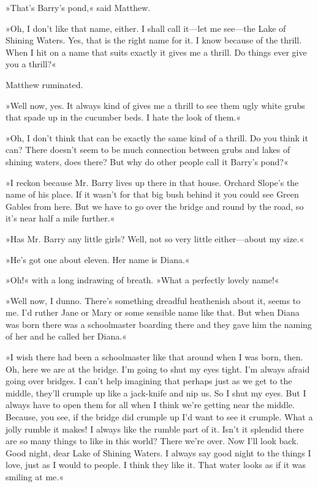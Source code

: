 »That’s Barry’s pond,« said Matthew.

»Oh, I don’t like that name, either. I shall call it—let me see—the Lake of Shining Waters. Yes, that is the right name for it. I know because of the thrill. When I hit on a name that suits exactly it gives me a thrill. Do things ever give you a thrill?«

Matthew ruminated.

»Well now, yes. It always kind of gives me a thrill to see them ugly white grubs that spade up in the cucumber beds. I hate the look of them.«

»Oh, I don’t think that can be exactly the same kind of a thrill. Do you think it can? There doesn’t seem to be much connection between grubs and lakes of shining waters, does there? But why do other people call it Barry’s pond?«

»I reckon because Mr. Barry lives up there in that house. Orchard Slope’s the name of his place. If it wasn’t for that big bush behind it you could see Green Gables from here. But we have to go over the bridge and round by the road, so it’s near half a mile further.«

»Has Mr. Barry any little girls? Well, not so very little either—about my size.«

»He’s got one about eleven. Her name is Diana.«

»Oh!« with a long indrawing of breath. »What a perfectly lovely name!«

»Well now, I dunno. There’s something dreadful heathenish about it, seems to me. I’d ruther Jane or Mary or some sensible name like that. But when Diana was born there was a schoolmaster boarding there and they gave him the naming of her and he called her Diana.«

»I wish there had been a schoolmaster like that around when I was born, then. Oh, here we are at the bridge. I’m going to shut my eyes tight. I’m always afraid going over bridges. I can’t help imagining that perhaps just as we get to the middle, they’ll crumple up like a jack-knife and nip us. So I shut my eyes. But I always have to open them for all when I think we’re getting near the middle. Because, you see, if the bridge did crumple up I’d want to see it crumple. What a jolly rumble it makes! I always like the rumble part of it. Isn’t it splendid there are so many things to like in this world? There we’re over. Now I’ll look back. Good night, dear Lake of Shining Waters. I always say good night to the things I love, just as I would to people. I think they like it. That water looks as if it was smiling at me.«


